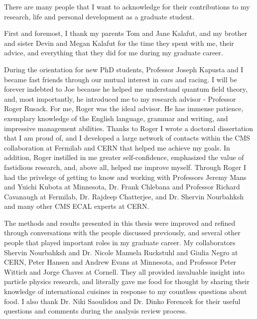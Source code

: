 
There are many people that I want to acknowledge for their contributions to my research, life and personal development 
as a graduate student.

First and foremost, I thank my parents Tom and Jane Kalafut, and my brother and sister Devin and Megan Kalafut for 
the time they spent with me, their advice, and everything that they did for me during my graduate career.

During the orientation for new PhD students, Professor Joseph Kapusta and I became fast friends 
through our mutual interest in cars and racing.  I will be forever indebted to Joe because he helped me understand quantum 
field theory, and, most importantly, he introduced me to my research advisor - Professor Roger Rusack.  For me, Roger 
was the ideal advisor.  He has immense patience, exemplary knowledge of the English language, grammar and writing, and 
impressive management abilities.  Thanks to Roger I wrote a doctoral dissertation that I am proud of, and I developed a 
large network of contacts within the CMS collaboration at Fermilab and CERN that helped me achieve my goals.  In addition, 
Roger instilled in me greater self-confidence, emphasized the value of fastidious research, and, above all, helped me 
improve myself.  Through Roger I had the privelege of getting to know and working with Professors Jeremy Mans and Yuichi 
Kubota at Minnesota, Dr. Frank Chlebana and Professor Richard Cavanaugh at Fermilab, Dr. Rajdeep Chatterjee, and Dr. Shervin 
Nourbahksh and many other CMS ECAL experts at CERN.  

The methods and results presented in this thesis were improved and refined through conversations with the people discussed 
previously, and several other people that played important roles in my graduate career.  My collaborators Shervin Nourbahksh 
and Dr. Nicole Manuela Ruckstuhl and Giulia Negro at CERN, Peter Hansen and Andrew Evans at Minnesota, and Professor Peter 
Wittich and Jorge Chaves at Cornell.  They all provided invaluable insight into particle physics research, and literally 
gave me food for thought by sharing their knowledge of international cuisines in response to my countless questions about 
food.  I also thank Dr. Niki Saoulidou and Dr. Dinko Ferencek for their useful questions and comments during the analysis 
review process.

